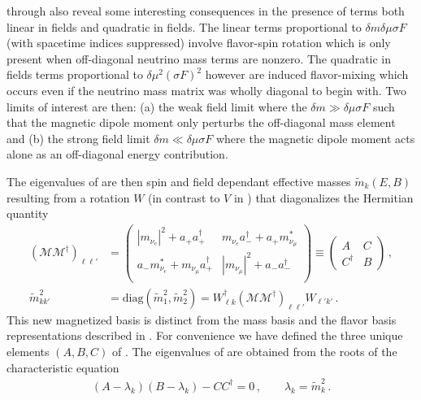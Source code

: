  through  also reveal some interesting consequences in the presence of terms both linear in fields and quadratic in fields. The linear terms proportional to $\delta m\delta\mu\sigma F$ (with spacetime indices suppressed) involve flavor-spin rotation which is only present when off-diagonal neutrino mass terms are nonzero. The quadratic in fields terms proportional to $\delta\mu^{2}(\sigma F)^{2}$ however are induced flavor-mixing which occurs even if the neutrino mass matrix was wholly diagonal to begin with. Two limits of interest are then: (a) the weak field limit where the $\delta m\gg\delta\mu\sigma F$ such that the magnetic dipole moment only perturbs the off-diagonal mass element and (b) the strong field limit $\delta m\ll\delta\mu\sigma F$ where the magnetic dipole moment acts alone as an off-diagonal energy contribution.

The eigenvalues of  are then spin and field dependant effective masses $\widetilde{m}_{k}(E,B)$ resulting from a rotation $W$ (in contrast to $V$ in ) that diagonalizes the Hermitian quantity 
\begin{align}
    \label{herm:1}
    \left(\mathcal{M}\mathcal{M}^{\dag}\right)_{\ell\ell'}&=
    \begin{pmatrix}
        |m_{\nu_{e}}|^{2}+a_{+}a_{+}^{\dag} & m_{\nu_{e}}a_{-}^{\dag}+a_{+}m_{\nu_{\mu}}^{*}\\
        a_{-}m_{\nu_{e}}^{*}+m_{\nu_{\mu}}a_{+}^{\dag} & |m_{\nu_{\mu}}|^{2}+a_{-}a_{-}^{\dag}\\
    \end{pmatrix}\equiv
    \begin{pmatrix}
        A & C\\
        C^{\dag} & B
    \end{pmatrix}\,,\\
    \label{herm:2}
    \widetilde{m}^{2}_{kk'}&= \mathrm{diag}(\widetilde{m}_{1}^{2},\widetilde{m}_{2}^{2})=W_{\ell k}^{\dag}\left(\mathcal{M}\mathcal{M}^{\dag}\right)_{\ell\ell'}W_{\ell'k'}\,.
\end{align}
This new magnetized basis is distinct from the mass basis and the flavor basis representations described in . For convenience we have defined the three unique elements $(A,B,C)$ of . The eigenvalues of  are obtained from the roots of the characteristic equation
\begin{align}
    \label{secular:1}
    (A-\lambda_{k})(B-\lambda_{k})-CC^{\dag}=0\,,\qquad
    \lambda_{k}=\widetilde m_{k}^{2}\,.
\end{align}





